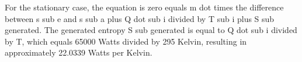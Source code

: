 For the stationary case, the equation is zero equals m dot times the difference between s sub e and s sub a plus Q dot sub i divided by T sub i plus S sub generated. The generated entropy S sub generated is equal to Q dot sub i divided by T, which equals 65000 Watts divided by 295 Kelvin, resulting in approximately 22.0339 Watts per Kelvin.